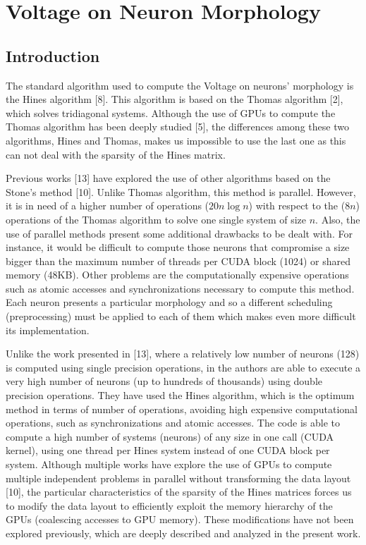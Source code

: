 
\chapter{Voltage on Neuron Morphology}

\section{Introduction}

The standard algorithm used to compute the Voltage on neurons' morphology
 is the Hines algorithm [8]. This algorithm is based on the Thomas 
 algorithm [2], which solves tridiagonal systems. Although the use of
  GPUs to compute the Thomas algorithm has been deeply studied 
  [5], the differences among these two algorithms,
   Hines and Thomas, makes us impossible to use the last one as this 
   can not deal with the sparsity of the Hines matrix.

Previous works [13] have explored the use of other algorithms based on
 the Stone's method [10]. Unlike Thomas algorithm, this method is
  parallel. However, it is in need of a higher number of operations 
  ($20 n \log n$) with respect to the ($8n$) operations of the Thomas
   algorithm to solve one single system of size $n$. Also, the use of 
   parallel methods present some additional drawbacks to be dealt with.
    For instance, it would be difficult to compute those neurons that
     compromise a size bigger than the maximum number of threads per CUDA block (1024) or shared memory (48KB). Other problems are the computationally expensive operations such as atomic accesses and synchronizations necessary to compute this method. Each neuron presents a particular morphology and so a different scheduling (preprocessing) must be applied to each of them which makes even more difficult its implementation.

Unlike the work presented in [13], where a relatively low number of 
neurons (128) is computed using single precision operations, in \cite{cuHines}
 the authors are able to execute a very high number of neurons 
 (up to hundreds of thousands) using double precision operations. 
 They have used the Hines algorithm, which is the optimum method in 
 terms of number of operations, avoiding high expensive computational
  operations, such as synchronizations and atomic accesses. The code
   is able to compute a high number of systems (neurons) of any size in
    one call (CUDA kernel), using one thread per Hines system instead of
     one CUDA block per system. Although multiple works have explore the
      use of GPUs to compute multiple independent problems in parallel
       without transforming the data layout [10], the 
       particular characteristics of the sparsity of the Hines matrices
        forces us to modify the data layout to efficiently exploit the 
        memory hierarchy of the GPUs (coalescing accesses to GPU memory).
         These modifications have not been explored previously, which are
          deeply described and analyzed in the present work.


